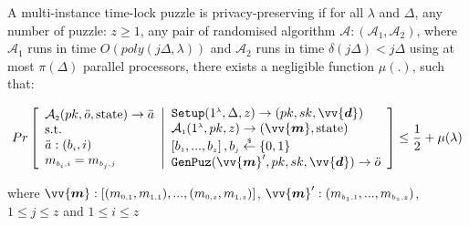   
  
\begin{definition}\label{Def::Solution-Privacy} A multi-instance time-lock puzzle  is privacy-preserving  if for all $\lambda$ and  $\Delta$,  any number of puzzle: $z\geq1$, any pair of randomised algorithm $\mathcal{A} : (\mathcal{A}_{\scriptscriptstyle 1},\mathcal{A}_{\scriptscriptstyle 2})$, where $\mathcal{A}_{\scriptscriptstyle 1}$ runs in  time $O(poly(j\Delta,\lambda))$ and $\mathcal{A}_{\scriptscriptstyle 2}$ runs in  time $\delta(j\Delta)<j\Delta$ using at most $\pi(\Delta)$ parallel processors, there exists a negligible function $\mu(.)$, such that: 


$$ Pr\left[  \begin{array}{l} 
 \mathcal{A}_{\scriptscriptstyle 2}(pk,\ddot{o},\text{state})\rightarrow \ddot{a}\\
 \text{s.t.}\\
\ddot{a}:(b_{\scriptscriptstyle i},i)\\
  m_{\scriptscriptstyle b_{\scriptscriptstyle i},i}=m_{\scriptscriptstyle b_{\scriptscriptstyle j},j} 
  \end{array}
 \middle |
    \begin{array}{l}
\mathtt{Setup}(1^{\scriptscriptstyle\lambda},\Delta,z)\rightarrow (pk,sk,\vv{\bm{d}})\\
\mathcal{A}_{\scriptscriptstyle 1}(1^{\scriptscriptstyle\lambda},pk,z)\rightarrow (\vv{\bm{m}},\text{state})\\
\left[b_{\scriptscriptstyle 1},...,b_{\scriptscriptstyle z}\right], b_{\scriptscriptstyle j}\stackrel{\scriptscriptstyle\$}\leftarrow \{0,1\}\\
\mathtt {GenPuz}(\vv{\bm{m}}', pk, sk,\vv{\bm{d}})\rightarrow \ddot{o}\\
\end{array}    \right]\leq \frac{1}{2}+\mu(\lambda)$$

where  $\vv{\bm{m}}: [(m_{\scriptscriptstyle 0,1},m_{\scriptscriptstyle 1,1}),...,(m_{\scriptscriptstyle 0,z},m_{\scriptscriptstyle 1,z})]$, $\vv{\bm{m}}':(m_{\scriptscriptstyle b_{\scriptscriptstyle 1},\scriptscriptstyle 1},..., m_{\scriptscriptstyle b_{\scriptscriptstyle z},\scriptscriptstyle z})$, $1\leq j\leq z$ and $1\leq i\leq z$
\end{definition}

